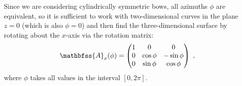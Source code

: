 Since we are considering cylindrically symmetric bows, all azimuths
\(\phi\) are equivalent, so it is sufficient to work with two-dimensional
curves in the plane \(z = 0\) (which is also \(\phi = 0\)) and then find
the three-dimensional surface by rotating about the \(x\)-axis via the
rotation matrix:
\begin{equation}
  \label{eq:Rotation-matrix-x}
  \mathbfss{A}_x(\phi) = 
   \begin{pmatrix}
    1 & 0 & 0 \\
    0 &\cos\phi & -\sin\phi \\
    0 &\sin\phi & \cos\phi 
  \end{pmatrix} \ ,
\end{equation}
where \(\phi\) takes all values in the interval \([0, 2\pi]\). 


